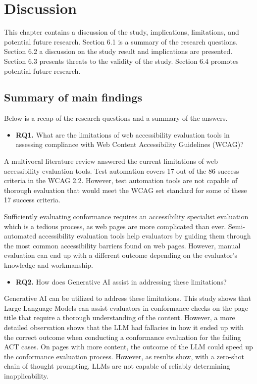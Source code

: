 \chapter{Discussion\label{discussion}}

This chapter contains a discussion of the study, implications, limitations, and potential future research. Section 6.1 is a summary of the research questions. Section 6.2 a discussion on the study result and implications are presented. Section 6.3 presents threats to the validity of the study. Section 6.4 promotes potential future research.

\section{Summary of main findings}

Below is a recap of the research questions and a summary of the answers.

\begin{itemize}
    \item \textbf{RQ1.} What are the limitations of web accessibility evaluation tools in assessing compliance with Web Content Accessibility Guidelines (WCAG)?
\end{itemize}

    A multivocal literature review answered the current limitations of web accessibility evaluation tools. Test automation covers 17 out of the 86 success criteria in the WCAG 2.2. However, test automation tools are not capable of thorough evaluation that would meet the WCAG set standard for some of these 17 success criteria. 

    Sufficiently evaluating conformance requires an accessibility specialist evaluation which is a tedious process, as web pages are more complicated than ever. Semi-automated accessibility evaluation tools help evaluators by guiding them through the most common accessibility barriers found on web pages. However, manual evaluation can end up with a different outcome depending on the evaluator's knowledge and workmanship.
    
\begin{itemize}
    \item \textbf{RQ2.} How does Generative AI assist in addressing these limitations?
\end{itemize}

    Generative AI can be utilized to address these limitations. This study shows that Large Language Models can assist evaluators in conformance checks on the page title that require a thorough understanding of the content. However, a more detailed observation shows that the LLM had fallacies in how it ended up with the correct outcome when conducting a conformance evaluation for the failing ACT cases. On pages with more content, the outcome of the LLM could speed up the conformance evaluation process. However, as results show, with a zero-shot chain of thought prompting, LLMs are not capable of reliably determining inapplicability.

